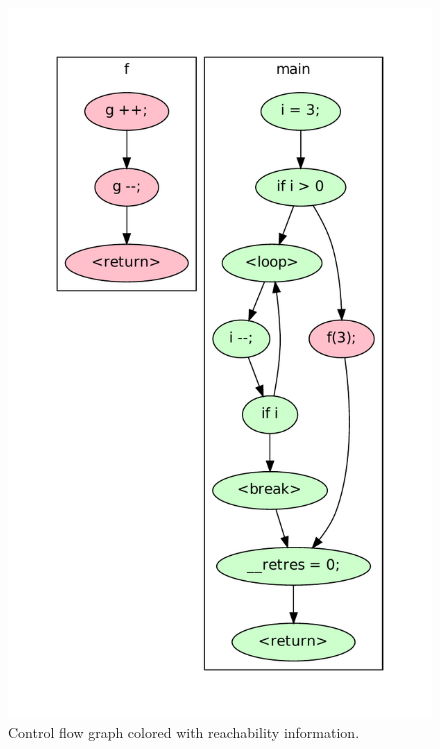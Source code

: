 \begin{figure}[htbp]
  \centering
  \begin{minipage}[h]{0.47\linewidth}
  \end{minipage}%
  \begin{minipage}[h]{0.4\linewidth}
    \includegraphics[width=\textwidth]{./tutorial/viewcfg/pdfs/cfg_colored.pdf}
  \end{minipage}
  \caption{Control flow graph colored with reachability information.}
  \label{fig:tut:coloredcfg}
\end{figure}

